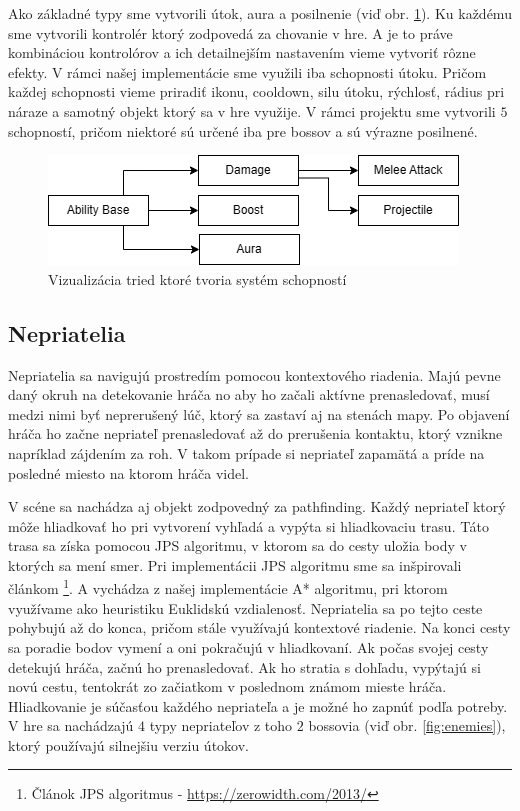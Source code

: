 Ako základné typy sme vytvorili útok, aura a posilnenie (viď obr. \ref{fig:spell-sys}). Ku každému sme vytvorili kontrolér ktorý zodpovedá za chovanie v hre. A je to práve kombináciou kontrolórov a ich detailnejším nastavením vieme vytvoriť rôzne efekty. V rámci našej implementácie sme využili iba schopnosti útoku. Pričom každej schopnosti vieme priradiť ikonu, cooldown, silu útoku, rýchlosť, rádius pri náraze a samotný objekt ktorý sa v hre využije. V rámci projektu sme vytvorili $5$ schopností, pričom niektoré sú určené iba pre bossov a sú výrazne posilnené.

\begin{figure} [H]
    \centering
    \includegraphics[width=0.75\linewidth]{obrazky-figures/spell-system.png}
    \caption{Vizualizácia tried ktoré tvoria systém schopností}
    \label{fig:spell-sys}
\end{figure}

\subsection{Nepriatelia}

Nepriatelia sa navigujú prostredím pomocou kontextového riadenia. Majú pevne daný okruh na detekovanie hráča no aby ho začali aktívne prenasledovať, musí medzi nimi byť neprerušený lúč, ktorý sa zastaví aj na stenách mapy. Po objavení hráča ho začne nepriateľ prenasledovať až do prerušenia kontaktu, ktorý vznikne napríklad zájdením za roh. V takom prípade si nepriateľ zapamätá a príde na posledné miesto na ktorom hráča videl.

V scéne sa nachádza aj objekt zodpovedný za pathfinding. Každý nepriateľ ktorý môže hliadkovať ho pri vytvorení vyhľadá a vypýta si hliadkovaciu trasu. Táto trasa sa získa pomocou JPS algoritmu, v ktorom sa do cesty uložia body v ktorých sa mení smer. Pri implementácii JPS algoritmu sme sa inšpirovali článkom \footnote{Článok JPS algoritmus - \url{https://zerowidth.com/2013/}}. A vychádza z našej implementácie A* algoritmu, pri ktorom využívame ako heuristiku Euklidskú vzdialenosť. Nepriatelia sa po tejto ceste pohybujú až do konca, pričom stále využívajú kontextové riadenie. Na konci cesty sa poradie bodov vymení a oni pokračujú v hliadkovaní. Ak počas svojej cesty detekujú hráča, začnú ho prenasledovať. Ak ho stratia s dohľadu, vypýtajú si novú cestu, tentokrát zo začiatkom v poslednom známom mieste hráča. Hliadkovanie je súčasťou každého nepriateľa a je možné ho zapnúť podľa potreby. V hre sa nachádzajú $4$ typy nepriateľov z toho $2$ bossovia (viď obr. \ref{fig:enemies}), ktorý používajú silnejšiu verziu útokov.

